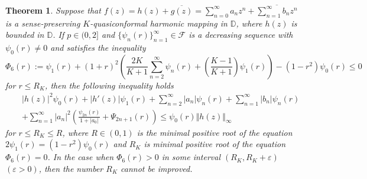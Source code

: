 \documentclass[11pt,reqno]{amsart}
\newtheorem{theo}{Theorem}[section]
\newtheorem{open problem}{Open problem}[section]
\newcommand{\F}{{\mathcal{F}}}
\newcommand{\ol}{\overline}
\newcommand{\be}{\begin{equation}}
\newcommand{\ee}{\end{equation}}
\newcommand{\beas}{\begin{eqnarray*}}
\newcommand{\eeas}{\end{eqnarray*}}
\renewcommand{\epsilon}{\varepsilon}
\numberwithin{equation}{section}
\begin{document}
\begin{theo}\label{T4} Suppose that $f(z)=h(z)+\ol{g(z)}=\sum_{n=0}^\infty a_n z^n+\ol{\sum_{n=1}^\infty b_n z^n}$ is a sense-preserving $K$-quasiconformal harmonic mapping in $\mathbb{D}$, where $h(z)$ is bounded in $\mathbb{D}$. If $p\in(0,2]$ and $\{\psi_n(r)\}_{n=1}^\infty\in\F$ is a decreasing sequence with $\psi_0(r)\not=0$ and satisfies the inequality
\be\label{t4} 
\Phi_6(r):=\psi_1(r)+(1+r)^2\left(\frac{2K}{K+1}\sum_{n=2}^\infty \psi_n(r)+\left(\frac{K-1}{K+1}\right)\psi_1(r)\right)-\left(1-r^2\right)\psi_0(r)\leq 0\ee
for $ r\leq R_{K}$, then the following inequality holds 
\beas &&|h(z)|^2\psi_0(r)+|h'(z)|\psi_1(r)+\sum_{n=2}^\infty |a_n| \psi_n(r)+\sum_{n=1}^\infty |b_n| \psi_n(r)\\[2mm]
&&+\sum_{n=1}^\infty |a_n|^2\left(\frac{\psi_{2n}(r)}{1+|a_0|}+\Psi_{2n+1}(r)\right)\leq \psi_0(r)\Vert h(z)\Vert_\infty\eeas
for $ r\leq R_{K}\leq R$, where $R\in(0,1)$ is the minimal positive root of the equation $2\psi_1(r)=\left(1-r^2\right)\psi_0(r)$
 and $R_{K}$ is minimal positive root of the equation $\Phi_6(r)=0$.
In the case when $\Phi_6(r)>0$ in some interval $(R_{K}, R_{K}+\epsilon)$ $(\epsilon>0)$, then the number $R_{K}$ cannot be improved.
\end{theo}
\end{document}
